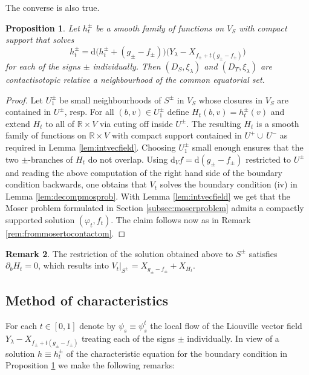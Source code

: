 \documentclass{amsart}
\newtheorem{prop}{Proposition}[subsection]
\theoremstyle{definition}
\newtheorem{rem}[prop]{Remark}
\newcommand{\rmd}{\mathrm d}
\newcommand{\R}{\mathbb R}
\begin{document}
The converse is also true.


\begin{prop}
\label{prop:charisteqn}
  Let $h_t^{\pm}$ be a smooth family of functions
  on $V_S$ with compact support that solves
  \[
    h_t^{\pm}=
    \rmd\big(h_t^{\pm}+(g_{\pm}-f_{\pm})\big)
    \big(Y_{\lambda}-X_{f_{\pm}+t(g_{\pm}-f_{\pm})}\big)
  \]
  for each of the signs $\pm$ individually.
  Then $(D_S,\xi_{\lambda})$ and $(D_T,\xi_{\lambda})$
  are contactisotopic relative a neighbourhood
  of the common equatorial set.
\end{prop}


\begin{proof}
  Let $U^{\pm}_1$ be small neighbourhoods of $S^{\pm}$ in $V_S$
  whose closures in $V_S$ are contained in $U^{\pm}\!$, resp.
  For all $(b,v)\in U^{\pm}_1$ define $H_t(b,v)=h_t^{\pm}(v)$
  and extend $H_t$ to all of $\R\times V$ via cuting off
  inside $U^{\pm}\!$.
  The resulting $H_t$ is a smooth family of functions
  on $\R\times V$ with compact support
  contained in $U^+\cup\,U^-$
  as required in Lemma \ref{lem:intvecfield}.
  Choosing $U^{\pm}_1$ small enough ensures
  that the two $\pm$-branches of $H_t$ do not overlap.
  Using $\rmd_V\!f=\rmd(g_{\pm}-f_{\pm})$ restricted to $U^{\pm}\!$
  and reading the above computation
  of the right hand side of the boundary condition backwards,
  one obtains that $V_t$ solves
  the boundary condition (iv) in Lemma \ref{lem:decompmosprob}.
  With Lemma \ref{lem:intvecfield} we get
  that the Moser problem formulated in Section \ref{subsec:moserproblem}
  admits a compactly supported solution $(\varphi_t,f_t)$.
  The claim follows now as in Remark \ref{rem:frommosertocontactom}.
\end{proof}


\begin{rem}
\label{rem:singsetshift}
  The restriction of the solution obtained above to $S^{\pm}$
  satisfies $\partial_bH_t=0$,
  which results into
  $V_t|_{S^{\pm}}=X_{g_{\pm}-f_{\pm}}+X_{H_t}$.
\end{rem}




\subsection{Method of characteristics}
\label{subsec:characteristics}


For each $t\in[0,1]$ denote by
$\psi_s\equiv\psi_s^t$ the local flow of the Liouville vector field
$Y_{\lambda}-X_{f_{\pm}+t(g_{\pm}-f_{\pm})}$
treating each of the signs $\pm$ individually.
In view of a solution $h\equiv h_t^{\pm}$
of the characteristic equation for the boundary condition
in Proposition \ref{prop:charisteqn}
we make the following remarks:
\end{document}
